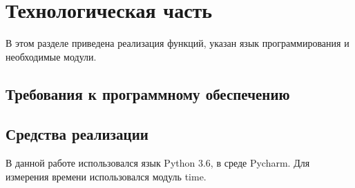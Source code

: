 \documentclass[12pt]{article}
\begin{document}
\newpage
\newpage
\section{Технологическая часть}

В этом разделе приведена реализация функций, указан язык программирования и необходимые модули. 
\subsection{Требования к программному обеспечению}

\subsection{Средства реализации}
В данной работе использовался язык Python 3.6, в среде Pycharm. Для измерения времени использовался модуль time.
\end{document}
